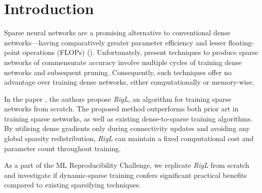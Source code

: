 \section{Introduction}


Sparse neural networks are a promising alternative to conventional dense networks---having comparatively greater parameter efficiency and lesser floating-point operations (FLOPs) (\citet{han2016eie,ashbyexploiting,Srinivas_2017_CVPR_Workshops}). Unfortunately, present techniques to produce sparse networks of commensurate accuracy involve multiple cycles of training dense networks and subsequent pruning. Consequently, such techniques offer no advantage over training dense networks, either computationally or memory-wise. 

In the paper \citet{rigl}, the authors propose \textit{RigL}, an algorithm for training sparse networks from scratch. The proposed method outperforms both prior art in training sparse networks, as well as existing dense-to-sparse training algorithms. By utilising dense gradients only during connectivity updates and avoiding any global sparsity redistribution, \textit{RigL} can maintain a fixed computational cost and parameter count throughout training.

As a part of the ML Reproducibility Challenge, we replicate \textit{RigL} from scratch and investigate if dynamic-sparse training confers significant practical benefits compared to existing sparsifying techniques.

